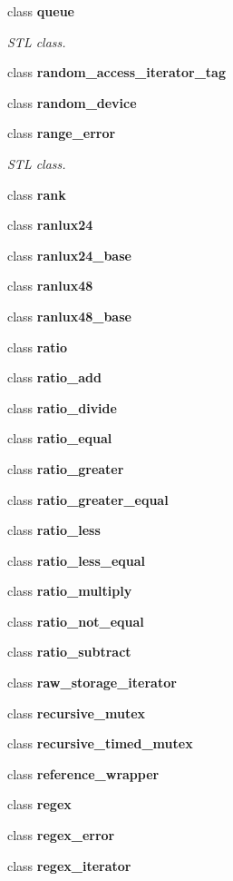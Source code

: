 \begin{DoxyCompactItemize}
\item 
class \textbf{ queue}
\begin{DoxyCompactList}\small\item\em S\+TL class. \end{DoxyCompactList}\item 
class \textbf{ random\+\_\+access\+\_\+iterator\+\_\+tag}
\item 
class \textbf{ random\+\_\+device}
\item 
class \textbf{ range\+\_\+error}
\begin{DoxyCompactList}\small\item\em S\+TL class. \end{DoxyCompactList}\item 
class \textbf{ rank}
\item 
class \textbf{ ranlux24}
\item 
class \textbf{ ranlux24\+\_\+base}
\item 
class \textbf{ ranlux48}
\item 
class \textbf{ ranlux48\+\_\+base}
\item 
class \textbf{ ratio}
\item 
class \textbf{ ratio\+\_\+add}
\item 
class \textbf{ ratio\+\_\+divide}
\item 
class \textbf{ ratio\+\_\+equal}
\item 
class \textbf{ ratio\+\_\+greater}
\item 
class \textbf{ ratio\+\_\+greater\+\_\+equal}
\item 
class \textbf{ ratio\+\_\+less}
\item 
class \textbf{ ratio\+\_\+less\+\_\+equal}
\item 
class \textbf{ ratio\+\_\+multiply}
\item 
class \textbf{ ratio\+\_\+not\+\_\+equal}
\item 
class \textbf{ ratio\+\_\+subtract}
\item 
class \textbf{ raw\+\_\+storage\+\_\+iterator}
\item 
class \textbf{ recursive\+\_\+mutex}
\item 
class \textbf{ recursive\+\_\+timed\+\_\+mutex}
\item 
class \textbf{ reference\+\_\+wrapper}
\item 
class \textbf{ regex}
\item 
class \textbf{ regex\+\_\+error}
\item 
class \textbf{ regex\+\_\+iterator}
\item 

\end{DoxyCompactItemize}
